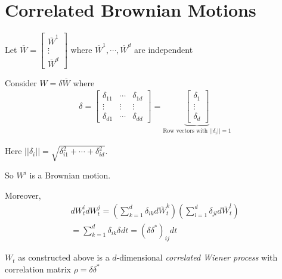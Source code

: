 \section{Correlated Brownian Motions}
Let $\overline{W} = \begin{bmatrix}\overline{W}^1\\\vdots\\\overline{W}^d\end{bmatrix}$ where $\overline{W}^1,\cdots,\overline{W}^d$ are independent
\par\bigskip
\noindent Consider $W = \delta\overline{W}$ where
\begin{equation*}
  \begin{gathered}
    \delta = \begin{bmatrix}\delta_{11}&\cdots&\delta_{1d}\\\vdots&\vdots&\vdots\\\delta_{d1}&\cdots&\delta_{dd}\end{bmatrix} = \underbrace{\begin{bmatrix}\delta_1\\\vdots\\\delta_d\end{bmatrix}}_{\text{Row vectors with $\left|\left|\delta_i\right|\right| = 1$}}
  \end{gathered}
\end{equation*}
\par\bigskip
\noindent Here $\left|\left|\delta_i\right|\right| = \sqrt{\delta_{i1}^2+\cdots+\delta_{id}^2}$.\par
\noindent So $W^i$ is a Brownian motion.
\par\bigskip
\noindent Moreover,
\begin{equation*}
  \begin{gathered}
    dW_t^idW_t^j = \left(\sum_{k=1}^{d}\delta_{ik}d\overline{W}_t^k\right)\left(\sum_{l=1}^{d}\delta_{jl}d\overline{W}_t^l\right)\\
    = \sum_{k=1}^{d}\delta_{ik}\delta_{}dt = (\delta\delta^*)_{ij}dt
  \end{gathered}
\end{equation*}
\par\bigskip
\begin{defo}{}
  $W_t$ as constructed above is a $d$-dimensional \textit{correlated Wiener process} with correlation matrix $\rho = \delta\delta^*$
\end{defo}
\par\bigskip
